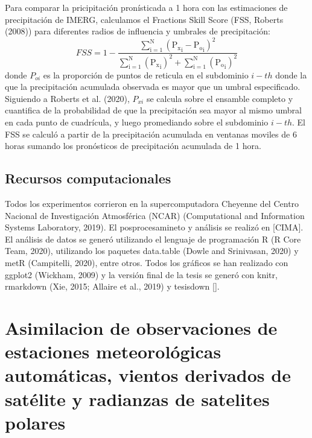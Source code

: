 \documentclass[12pt,twoside]{reedthesis}
\begin{document}
Para comparar la pricipitación pronísticada a 1 hora con las estimaciones de precipitación de IMERG, calculamos el Fractions Skill Score (FSS, Roberts (2008)) para diferentes radios de influencia y umbrales de precipitación:
\begin{equation}
  \mathrm{\mathit{FSS} = 1-\frac{\sum_{i=1}^{N} ({P_x}_i-{P_o}_i)^{2}}{\sum_{i=1}^{N} ({P_x}_i)^{2}+\sum_{i=1}^{N} ({P_o}_i)^{2}}}
    \label{eq:eq11}
\end{equation}
donde \(P_{oi}\) es la proporción de puntos de reticula en el subdominio \(i-th\) donde la que la precipitación acumulada observada es mayor que un umbral especificado. Siguiendo a Roberts et al. (2020), \(P_{xi}\) se calcula sobre el ensamble completo y cuantifica de la probabilidad de que la precipitación sea mayor al mismo umbral en cada punto de cuadrícula, y luego promediando sobre el subdominio \(i-th\).
El FSS se calculó a partir de la precipitación acumulada en ventanas moviles de 6 horas sumando los pronósticos de precipitación acumulada de 1 hora.

\hypertarget{recursos-computacionales}{%
\section{Recursos computacionales}\label{recursos-computacionales}}

Todos los experimentos corrieron en la supercomputadora Cheyenne del Centro Nacional de Investigación Atmosférica (NCAR) (Computational and Information Systems Laboratory, 2019). El posprocesamineto y análisis se realizó en {[}CIMA{]}. El análisis de datos se generó utilizando el lenguaje de programación R (R Core Team, 2020), utilizando los paquetes data.table (Dowle and Srinivasan, 2020) y metR (Campitelli, 2020), entre otros.
Todos los gráficos se han realizado con ggplot2 (Wickham, 2009) y la versión final de la tesis se generó con knitr, rmarkdown (Xie, 2015; Allaire et al., 2019) y tesisdown {[}{]}.

\hypertarget{asimilacion-de-observaciones-de-estaciones-meteoroluxf3gicas-automuxe1ticas-vientos-derivados-de-satuxe9lite-y-radianzas-de-satelites-polares}{%
\chapter{Asimilacion de observaciones de estaciones meteorológicas automáticas, vientos derivados de satélite y radianzas de satelites polares}\label{asimilacion-de-observaciones-de-estaciones-meteoroluxf3gicas-automuxe1ticas-vientos-derivados-de-satuxe9lite-y-radianzas-de-satelites-polares}}
\end{document}
